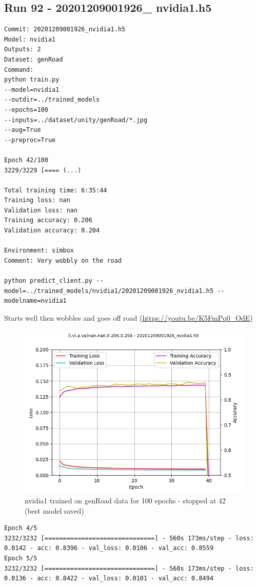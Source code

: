 \subsection{Run 92 - 20201209001926\_ nvidia1.h5 }
\begin{verbatim}
Commit: 20201209001926_nvidia1.h5
Model: nvidia1 
Outputs: 2
Dataset: genRoad
Command:
python train.py
--model=nvidia1
--outdir=../trained_models
--epochs=100
--inputs=../dataset/unity/genRoad/*.jpg
--aug=True
--preproc=True

Epoch 42/100
3229/3229 [==== (...)

Total training time: 6:35:44
Training loss: nan
Validation loss: nan
Training accuracy: 0.206
Validation accuracy: 0.204

Environment: simbox
Comment: Very wobbly on the road

python predict_client.py --model=../trained_models/nvidia1/20201209001926_nvidia1.h5 --modelname=nvidia1
\end{verbatim}
Starts well then wobbles and goes off road (\url{https://youtu.be/K5FmPq0_OdE})
\begin{figure}[ht]
 \centering 
 \includegraphics[width=\textwidth]{Figures/20201209001926_nvidia1_accuracy.png}
 \caption{nvidia1 trained on genRoad data for 100 epochs - stopped at 42 (best model saved)}
 \label{fig:20201209001926_nvidia1_accuracy} 
\end{figure}


\begin{verbatim}
Epoch 4/5
3232/3232 [==============================] - 560s 173ms/step - loss: 0.0142 - acc: 0.8396 - val_loss: 0.0106 - val_acc: 0.8559
Epoch 5/5
3232/3232 [==============================] - 560s 173ms/step - loss: 0.0136 - acc: 0.8422 - val_loss: 0.0101 - val_acc: 0.8494
    
\end{verbatim}







